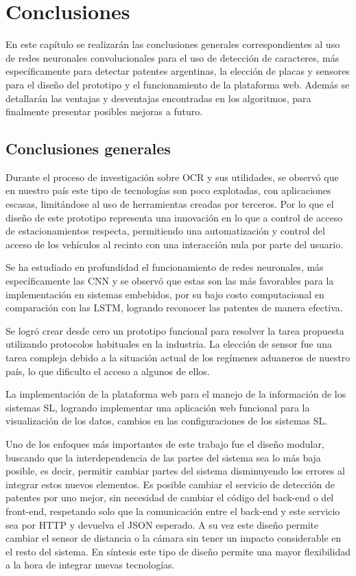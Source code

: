 \chapter{Conclusiones}
En este capítulo se realizarán las conclusiones generales correspondientes al uso de redes neuronales convolucionales para el uso de detección de caracteres, más específicamente para detectar patentes argentinas, la elección de placas y sensores para el diseño del prototipo y el funcionamiento de la plataforma web. Además se detallarán las ventajas y desventajas encontradas en los algoritmos, para finalmente presentar posibles mejoras a futuro.

\section{Conclusiones generales}

Durante el proceso de investigación sobre OCR y sus utilidades, se observó que en nuestro país este tipo de tecnologías son poco explotadas, con aplicaciones escasas, limitándose al uso de herramientas creadas por terceros.
Por lo que el diseño de este prototipo representa una innovación en lo que a control de acceso de estacionamientos respecta, permitiendo una automatización y control del acceso de los vehículos al recinto con una interacción nula por parte del usuario.

Se ha estudiado en profundidad el funcionamiento de redes neuronales, más específicamente las CNN y se observó que estas son las más favorables para la implementación en sistemas embebidos, por su bajo costo computacional en comparación con las LSTM, logrando reconocer las patentes de manera efectiva.

Se logró crear desde cero un prototipo funcional para resolver la tarea propuesta utilizando protocolos habituales en la industria.
La elección de sensor fue una tarea compleja debido a la situación actual de los regímenes aduaneros de nuestro país, lo que dificulto el acceso a algunos de ellos.

La implementación de la plataforma web para el manejo de la información de los sistemas SL, logrando implementar una aplicación web funcional para la visualización de los datos, cambios en las configuraciones de los sistemas SL.

Uno de los enfoques más importantes de este trabajo fue el diseño modular, buscando que la interdependencia de las partes del sistema sea lo más baja posible, es decir, permitir cambiar partes del sistema disminuyendo los errores al integrar estos nuevos elementos.
Es posible cambiar el servicio de detección de patentes por uno mejor, sin necesidad de cambiar el código del back-end o del front-end, respetando solo que la comunicación entre el back-end y este servicio sea por HTTP y devuelva el JSON esperado.
A su vez este diseño permite cambiar el sensor de distancia o la cámara sin tener un impacto considerable en el resto del sistema.
En síntesis este tipo de diseño permite una mayor flexibilidad a la hora de integrar nuevas tecnologías.

